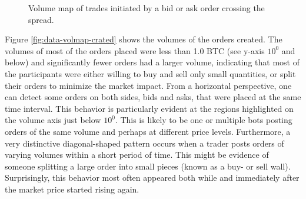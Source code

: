 \begin{figure}[H]
    \centering
    \caption{Volume map of trades initiated by a bid or ask order crossing the spread.}
    \label{fig:data-volmap-traded}
\end{figure}
Figure \ref{fig:data-volmap-crated} shows the volumes of the orders created.
The volumes of most of the orders placed were less than 1.0 BTC (see y-axis $10^0$ and below) and significantly fewer orders had a larger volume, indicating that most of the participants were either willing to buy and sell only small quantities, or split their orders to minimize the market impact.
From a horizontal perspective, one can detect some orders on both sides, bids and asks, that were placed at the same time interval.
This behavior is particularly evident at the regions highlighted on the volume axis just below $10^0$.
This is likely to be one or multiple bots posting orders of the same volume and perhaps at different price levels\cite{schluetter2010system}.
Furthermore, a very distinctive diagonal-shaped pattern occurs when a trader posts orders of varying volumes within a short period of time.
This might be evidence of someone splitting a large order into small pieces (known as a buy- or sell wall).
Surprisingly, this behavior most often appeared both while and immediately after the market price started rising again. 

